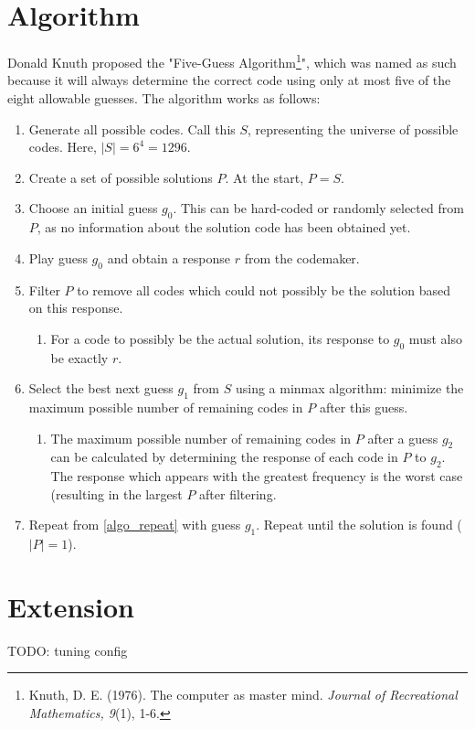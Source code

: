 \documentclass{article}
\begin{document}
\section{Algorithm}
Donald Knuth proposed the "Five-Guess Algorithm\footnote{Knuth, D. E. (1976). The computer as master mind. \textit{Journal of Recreational Mathematics, 9}(1), 1-6.}", which was named as such because it will always determine the correct code using only at most five of the eight allowable guesses. The algorithm works as follows:
\begin{enumerate}[label=\textbf{S.\arabic*}]
	\item Generate all possible codes. Call this $S$, representing the universe of possible codes. Here, $|S| = 6^4 = 1296$.
	\item Create a set of possible solutions $P$. At the start, $P=S$.
	\item Choose an initial guess $g_0$. This can be hard-coded or randomly selected from $P$, as no information about the solution code has been obtained yet.
	\item \label{algo_repeat} Play guess $g_0$ and obtain a response $r$ from the codemaker.
	\item Filter $P$ to remove all codes which could not possibly be the solution based on this response.
		\begin{enumerate}
		\item For a code to possibly be the actual solution, its response to $g_0$ must also be exactly $r$.
		\end{enumerate}
	\item Select the best next guess $g_1$ from $S$ using a minmax algorithm: minimize the maximum possible number of remaining codes in $P$ after this guess.
		\begin{enumerate}
		\item The maximum possible number of remaining codes in $P$ after a guess $g_2$ can be calculated by determining the response of each code in $P$ to $g_2$. The response which appears with the greatest frequency is the worst case (resulting in the largest $P$ after filtering.
		\end{enumerate}
	\item Repeat from \ref{algo_repeat} with guess $g_1$. Repeat until the solution is found ($|P|=1$).
\end{enumerate}

\section{Extension}
TODO: tuning config
\end{document}
